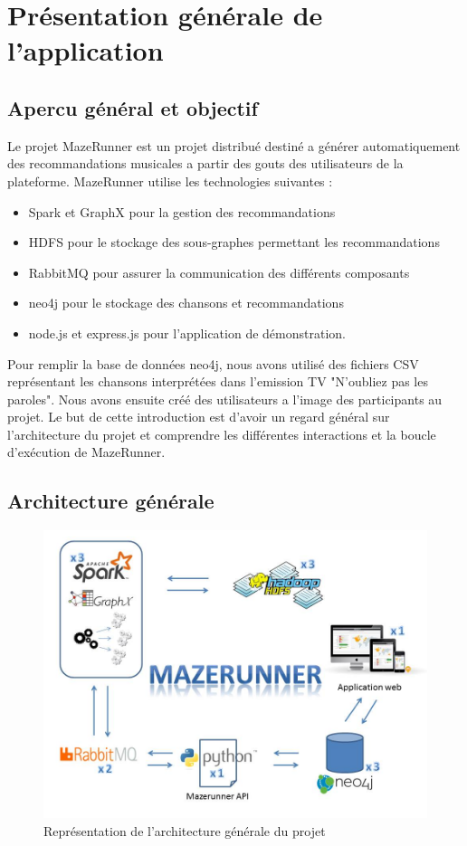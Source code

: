 \section{Présentation générale de l'application}

\subsection{Apercu général et objectif}

Le projet MazeRunner est un projet distribué destiné a générer automatiquement des recommandations musicales a partir des gouts des utilisateurs de la plateforme.
MazeRunner utilise les technologies suivantes :
\begin{itemize}
  \item Spark et GraphX pour la gestion des recommandations
  \item HDFS pour le stockage des sous-graphes permettant les recommandations
  \item RabbitMQ pour assurer la communication des différents composants
  \item neo4j pour le stockage des chansons et recommandations
  \item node.js et express.js pour l'application de démonstration.
\end{itemize}

Pour remplir la base de données neo4j, nous avons utilisé des fichiers CSV représentant les chansons interprétées dans l'emission TV "N'oubliez pas les paroles".
Nous avons ensuite créé des utilisateurs a l'image des participants au projet. Le but de cette introduction est d'avoir un regard général sur l'architecture du projet et comprendre les différentes interactions et la boucle d'exécution de MazeRunner.

\subsection{Architecture générale}

\begin{figure}
    \centering
    \includegraphics[scale=0.7]{pics/schema_architecture_global.jpg}
    \caption{Représentation de l'architecture générale du projet}
\end{figure}


